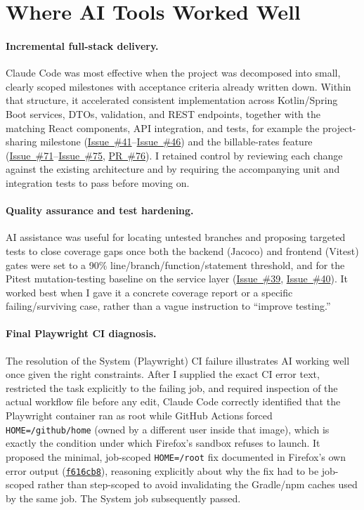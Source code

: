 \documentclass[11pt,a4paper]{article}
\newcommand{\repourl}{https://github.com/se2p-classrooms/final-project-ayoubalila}
\newcommand{\ghissue}[1]{\href{\repourl/issues/#1}{Issue~\##1}}
\newcommand{\ghpr}[1]{\href{\repourl/pull/#1}{PR~\##1}}
\newcommand{\ghcommit}[1]{\href{\repourl/commit/#1}{\texttt{#1}}}
\begin{document}
\section{Where AI Tools Worked Well}
\label{sec:worked-well}

\paragraph{Incremental full-stack delivery.} Claude Code was most effective when the project was decomposed into small, clearly scoped milestones with acceptance criteria already written down. Within that structure, it accelerated consistent implementation across Kotlin/Spring Boot services, DTOs, validation, and REST endpoints, together with the matching React components, API integration, and tests, for example the project-sharing milestone (\ghissue{41}--\ghissue{46}) and the billable-rates feature (\ghissue{71}--\ghissue{75}, \ghpr{76}). I retained control by reviewing each change against the existing architecture and by requiring the accompanying unit and integration tests to pass before moving on.

\paragraph{Quality assurance and test hardening.} AI assistance was useful for locating untested branches and proposing targeted tests to close coverage gaps once both the backend (Jacoco) and frontend (Vitest) gates were set to a 90\% line/branch/function/statement threshold, and for the Pitest mutation-testing baseline on the service layer (\ghissue{39}, \ghissue{40}). It worked best when I gave it a concrete coverage report or a specific failing/surviving case, rather than a vague instruction to ``improve testing.''

\paragraph{Final Playwright CI diagnosis.} The resolution of the System (Playwright) CI failure illustrates AI working well once given the right constraints. After I supplied the exact CI error text, restricted the task explicitly to the failing job, and required inspection of the actual workflow file before any edit, Claude Code correctly identified that the Playwright container ran as root while GitHub Actions forced \texttt{HOME=/github/home} (owned by a different user inside that image), which is exactly the condition under which Firefox's sandbox refuses to launch. It proposed the minimal, job-scoped \texttt{HOME=/root} fix documented in Firefox's own error output (\ghcommit{f616cb8}), reasoning explicitly about why the fix had to be job-scoped rather than step-scoped to avoid invalidating the Gradle/npm caches used by the same job. The System job subsequently passed.
\end{document}
